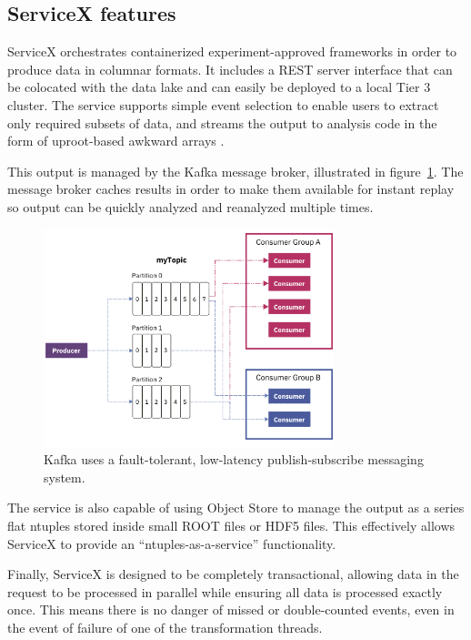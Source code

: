 \documentclass{webofc}
\begin{document}
\subsection{ServiceX features}
\label{subsec:features}

ServiceX orchestrates containerized experiment-approved frameworks in order to produce data in
columnar formats. It includes a REST server interface that can be colocated with the data lake and
can easily be deployed to a local Tier 3 cluster. The service supports simple event selection to
enable users to extract only required subsets of data, and streams the output to analysis code in
the form of uproot-based awkward arrays \cite{uproot}.

This output is managed by the Kafka \cite{RefEventStreams} message broker, illustrated in
figure~\ref{fig:kafka}. The message broker caches results in order to make them available for
instant replay so output can be quickly analyzed and reanalyzed multiple times.

\begin{figure}[ht]
  \centering
  \includegraphics[width=0.75\textwidth]{kafka}
  \caption{Kafka uses a fault-tolerant, low-latency publish-subscribe messaging system.}
  \label{fig:kafka}
\end{figure}

The service is also capable of using Object Store to manage the output as a series flat ntuples
stored inside small ROOT files or HDF5 files. This effectively allows ServiceX to provide an
``ntuples-as-a-service'' functionality.

Finally, ServiceX is designed to be completely transactional, allowing data in the request to be
processed in parallel while ensuring all data is processed exactly once. This means there is no
danger of missed or double-counted events, even in the event of failure of one of the
transformation threads.
\end{document}
